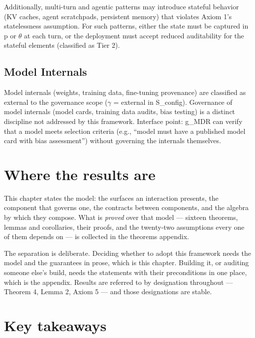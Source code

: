 Additionally, multi-turn and agentic patterns may introduce stateful behavior (KV caches, agent scratchpads, persistent memory) that violates Axiom 1's statelessness assumption. For such patterns, either the state must be captured in p or $\theta$ at each turn, or the deployment must accept reduced auditability for the stateful elements (classified as Tier 2).

\subsection{Model Internals}


Model internals (weights, training data, fine-tuning provenance) are classified as external to the governance scope ($\gamma$ = external in S\_\allowbreak{}config). Governance of model internals (model cards, training data audits, bias testing) is a distinct discipline not addressed by this framework. Interface point: g\_\allowbreak{}MDR can verify that a model meets selection criteria (e.g., ``model must have a published model card with bias assessment'') without governing the internals themselves.



\section{Where the results are}


This chapter states the model: the surfaces an interaction presents, the component
that governs one, the contracts between components, and the algebra by which they
compose. What is \emph{proved} over that model --- sixteen theorems, lemmas and
corollaries, their proofs, and the twenty-two assumptions every one of them depends
on --- is collected in the theorems appendix.

The separation is deliberate. Deciding whether to adopt this framework needs the
model and the guarantees in prose, which is this chapter. Building it, or auditing
someone else's build, needs the statements with their preconditions in one place,
which is the appendix. Results are referred to by designation throughout --- Theorem
4, Lemma 2, Axiom 5 --- and those designations are stable.

\section{Key takeaways}


